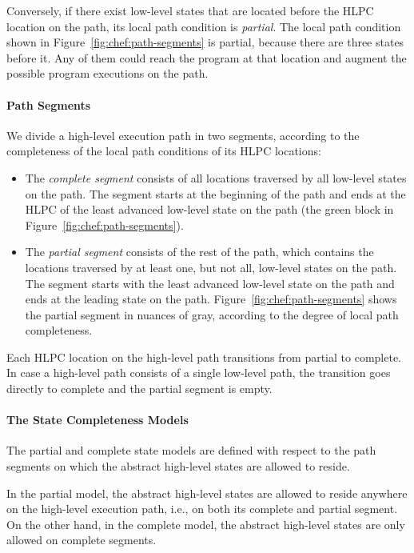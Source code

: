 Conversely, if there exist low-level states that are located before the HLPC location on the path, its local path condition is \emph{partial}.
%
The local path condition shown in Figure~\ref{fig:chef:path-segments} is partial, because there are three states before it.
%
Any of them could reach the program at that location and augment the possible program executions on the path.

\paragraph{Path Segments}

We divide a high-level execution path in two segments, according to the completeness of the local path conditions of its HLPC locations:
\begin{itemize}
\item The \emph{complete segment} consists of all locations traversed by all low-level states on the path.
%
The segment starts at the beginning of the path and ends at the HLPC of the least advanced low-level state on the path (the green block in Figure~\ref{fig:chef:path-segments}).
\item The \emph{partial segment} consists of the rest of the path, which contains the locations traversed by at least one, but not all, low-level states on the path.
%
The segment starts with the least advanced low-level state on the path and ends at the leading state on the path.  Figure~\ref{fig:chef:path-segments} shows the partial segment in nuances of gray, according to the degree of local path completeness.
\end{itemize}

Each HLPC location on the high-level path transitions from partial to complete.
%
In case a high-level path consists of a single low-level path, the transition goes directly to complete and the partial segment is empty.

\paragraph{The State Completeness Models}

The partial and complete state models are defined with respect to the path segments on which the abstract high-level states are allowed to reside.

In the partial model, the abstract high-level states are allowed to reside anywhere on the high-level execution path, i.e., on both its complete and partial segment.
%
On the other hand, in the complete model, the abstract high-level states are only allowed on complete segments.

